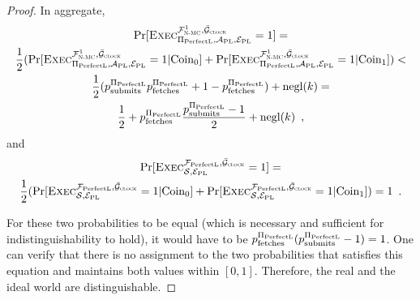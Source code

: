 \begin{proof}
    In aggregate,
    \begin{gather*}
      \Pr[\textsc{Exec}^{\mathcal{F}_{\textsc{N-MC}}^1, \bar{\mathcal{G}}_{\textsc{clock}}}_{\Pi_{\mathrm{PerfectL}}, \mathcal{A}_{\mathrm{PL}},
      \mathcal{E}_{\mathrm{PL}}} = 1] = \\
      \frac{1}{2}(\Pr[\textsc{Exec}^{\mathcal{F}_{\textsc{N-MC}}^1, \bar{\mathcal{G}}_{\textsc{clock}}}_{\Pi_{\mathrm{PerfectL}},
      \mathcal{A}_{\mathrm{PL}}, \mathcal{E}_{\mathrm{PL}}} = 1 | \mathrm{Coin}_0] +
      \Pr[\textsc{Exec}^{\mathcal{F}_{\textsc{N-MC}}^1, \bar{\mathcal{G}}_{\textsc{clock}}}_{\Pi_{\mathrm{PerfectL}}, \mathcal{A}_{\mathrm{PL}},
      \mathcal{E}_{\mathrm{PL}}} = 1 | \mathrm{Coin}_1]) < \\
      \frac{1}{2}(p^{\Pi_{\mathrm{PerfectL}}}_{\mathrm{submits}} p^{\Pi_{\mathrm{PerfectL}}}_{\mathrm{fetches}} + 1 - p^{\Pi_{\mathrm{PerfectL}}}_{\mathrm{fetches}}) + \text{negl}(k) = \\
      \frac{1}{2} + p^{\Pi_{\mathrm{PerfectL}}}_{\mathrm{fetches}} \frac{p^{\Pi_{\mathrm{PerfectL}}}_{\mathrm{submits}} - 1}{2} + \text{negl}(k) \enspace,
    \end{gather*}
    and
    \begin{gather*}
      \Pr[\textsc{Exec}^{\mathcal{F}_{\mathrm{PerfectL}}, \bar{\mathcal{G}}_{\textsc{clock}}}_{\mathcal{S}, \mathcal{E}_{\mathrm{PL}}} =
      1] = \\
      \frac{1}{2}(\Pr[\textsc{Exec}^{\mathcal{F}_{\mathrm{PerfectL}}, \bar{\mathcal{G}}_{\textsc{clock}}}_{\mathcal{S},
      \mathcal{E}_{\mathrm{PL}}} = 1 | \mathrm{Coin}_0] + \Pr[\textsc{Exec}^{\mathcal{F}_{\mathrm{PerfectL}},
      \bar{\mathcal{G}}_{\textsc{clock}}}_{\mathcal{S}, \mathcal{E}_{\mathrm{PL}}} = 1 | \mathrm{Coin}_1]) = 1 \enspace.
    \end{gather*}

    For these two probabilities to be equal (which is necessary and sufficient
    for indistinguishability to hold), it would have to be
    $p^{\Pi_{\mathrm{PerfectL}}}_{\mathrm{fetches}}(p^{\Pi_{\mathrm{PerfectL}}}_{\mathrm{submits}} - 1) = 1$. One can verify that there is no assignment
    to the two probabilities that satisfies this equation and maintains both
    values within $[0, 1]$. Therefore, the real and the ideal world are
    distinguishable.
  \end{proof}
